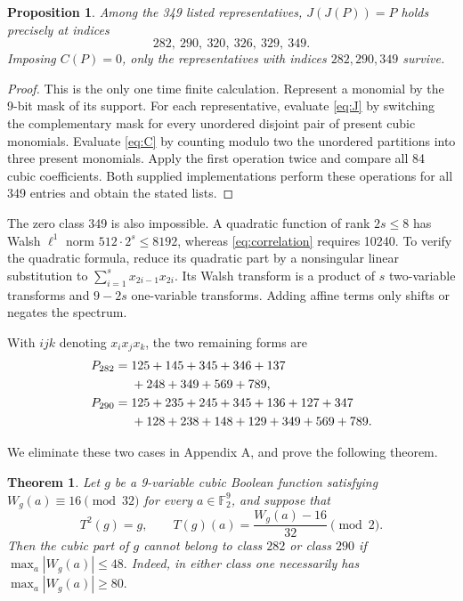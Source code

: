 \documentclass[11pt]{article}
\newtheorem{theorem}{Theorem}
\newtheorem{proposition}{Proposition}
\newtheorem{open problem}{Open problem}
\begin{document}
\begin{proposition}\label{prop:filter}
Among the 349 listed representatives, $J(J(P))=P$ holds precisely at indices
\[
282,\ 290,\ 320,\ 326,\ 329,\ 349.
\]
Imposing $C(P)=0$, only the representatives with indices $282,290,349$ survive.
\end{proposition}
\begin{proof}
This is the only one time finite calculation. Represent a monomial by the 9-bit mask of its support. For each representative, evaluate \eqref{eq:J} by switching the complementary mask for every unordered disjoint pair of present cubic monomials. Evaluate \eqref{eq:C} by counting modulo two the unordered partitions into three present monomials. Apply the first operation twice and compare all 84 cubic coefficients. Both supplied implementations perform these operations for all 349 entries and obtain the stated lists.
\end{proof}

The zero class 349 is also impossible. A quadratic function of rank $2s\le8$ has Walsh $\ell^1$ norm $512\cdot2^s\le8192$, whereas \eqref{eq:correlation} requires 10240. To verify the quadratic formula, reduce its quadratic part by a nonsingular linear substitution to $\sum_{i=1}^s x_{2i-1}x_{2i}$. Its Walsh transform is a product of $s$ two-variable transforms and $9-2s$ one-variable transforms. Adding affine terms only shifts or negates the spectrum.

With $ijk$ denoting $x_ix_jx_k$, the two remaining forms are
\begin{align}
P_{282}={}&125+145+345+346+137\notag\\
          &+248+349+569+789,\label{eq:P282}\\
P_{290}={}&125+235+245+345+136+127+347\notag\\
          &+128+238+148+129+349+569+789.\label{eq:P290}
\end{align}

We eliminate these two cases in Appendix A, and prove the following theorem.
\begin{theorem} \label{66}
Let $g$ be a 9-variable cubic Boolean function satisfying
$
W_g(a)\equiv16\pmod{32}
$
for every $a\in \mathbb{F}_2^9$, and suppose that
\[
T^2(g)=g,
\qquad
T(g)(a)=\frac{W_g(a)-16}{32}\pmod2.
\]
Then the cubic part of $g$ cannot belong to class $282$ or class $290$ if
$
\max_a|W_g(a)|\le48.
$
Indeed, in either class one necessarily has
$
{\max_a|W_g(a)|\ge80.}
$
\end{theorem}
\end{document}
